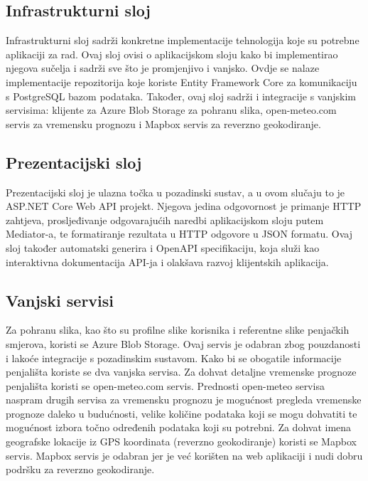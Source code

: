 \subsection{Infrastrukturni sloj}

Infrastrukturni sloj sadrži konkretne implementacije tehnologija koje su potrebne aplikaciji za rad. Ovaj sloj ovisi o aplikacijskom sloju kako bi implementirao njegova sučelja i sadrži sve što je promjenjivo i vanjsko. Ovdje se nalaze implementacije repozitorija koje koriste Entity Framework Core za komunikaciju s PostgreSQL bazom podataka. Također, ovaj sloj sadrži i integracije s vanjskim servisima: klijente za Azure Blob Storage za pohranu slika, open-meteo.com servis za vremensku prognozu i Mapbox servis za reverzno geokodiranje.

\subsection{Prezentacijski sloj}

Prezentacijski sloj je ulazna točka u pozadinski sustav, a u ovom slučaju to je ASP.NET Core Web API projekt. Njegova jedina odgovornost je primanje HTTP zahtjeva, prosljeđivanje odgovarajućih naredbi aplikacijskom sloju putem Mediator-a, te formatiranje rezultata u HTTP odgovore u JSON formatu. Ovaj sloj također automatski generira i OpenAPI specifikaciju, koja služi kao interaktivna dokumentacija API-ja i olakšava razvoj klijentskih aplikacija.


\subsection{Vanjski servisi}

Za pohranu slika, kao što su profilne slike korisnika i referentne slike penjačkih smjerova, koristi se Azure Blob Storage. Ovaj servis je odabran zbog pouzdanosti i lakoće integracije s pozadinskim sustavom. Kako bi se obogatile informacije penjališta koriste se dva vanjska servisa. Za dohvat detaljne vremenske prognoze penjališta koristi se open-meteo.com servis. Prednosti open-meteo servisa naspram drugih servisa za vremensku prognozu je mogućnost pregleda vremenske prognoze daleko u budućnosti, velike količine podataka koji se mogu dohvatiti te mogućnost izbora točno određenih podataka koji su potrebni. Za dohvat imena geografske lokacije iz GPS koordinata (reverzno geokodiranje) koristi se Mapbox servis. Mapbox servis je odabran jer je već korišten na web aplikaciji i nudi dobru podršku za reverzno geokodiranje.

